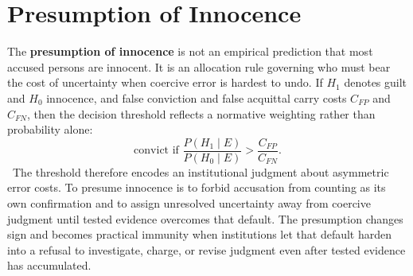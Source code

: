 
\chapter{Presumption of Innocence}
\label{ch:ch045}

The \textbf{presumption of innocence} is not an empirical prediction that most accused persons are innocent. It is an allocation rule governing who must bear the cost of uncertainty when coercive error is hardest to undo. If \(H_1\) denotes guilt and \(H_0\) innocence, and false conviction and false acquittal carry costs \(C_{FP}\) and \(C_{FN}\), then the decision threshold reflects a normative weighting rather than probability alone:
\[
\text{convict if }
\frac{P(H_1\mid E)}{P(H_0\mid E)}
>
\frac{C_{FP}}{C_{FN}}.
\]
\ToyModel\ The threshold therefore encodes an institutional judgment about asymmetric error costs.
To presume innocence is to forbid accusation from counting as its own confirmation and to assign unresolved uncertainty away from coercive judgment until tested evidence overcomes that default. The presumption changes sign and becomes practical immunity when institutions let that default harden into a refusal to investigate, charge, or revise judgment even after tested evidence has accumulated.
